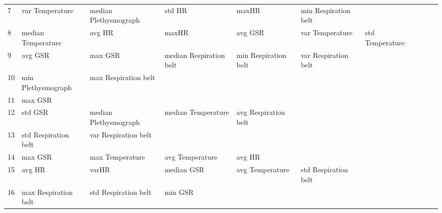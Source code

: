 \begin{landscape}
\begin{table}[]
\begin{tabular}{l|llllllll}
7        & var Temperature         & median Plethysmograph & std HR                  & maxHR                   & min Respiration belt    &                       &                      &          &                      &        \\
8        & median Temperature      & avg HR                & maxHR                   & avg GSR                 & var Temperature         & std Temperature       &                      &          &                      &        \\
9        & avg GSR                 & max GSR               & median Respiration belt & min Respiration belt    & var Respiration belt    &                       &                      &          &                      &        \\
10       & min Plethysmograph      & max Respiration belt  &                         &                         &                         &                       &                      &          &                      &        \\
11       & max GSR                 &                       &                         &                         &                         &                       &                      &          &                      &        \\
12       & std GSR                 & median Plethysmograph & median Temperature      & avg Respiration belt    &                         &                       &                      &          &                      &        \\
13       & std Respiration belt    & var Respiration belt  &                         &                         &                         &                       &                      &          &                      &        \\
14       & max GSR                 & max Temperature       & avg Temperature         & avg HR                  &                         &                       &                      &          &                      &        \\
15       & avg HR                  & varHR                 & median GSR              & avg Temperature         & std Respiration belt    &                       &                      &          &                      &        \\
16       & max Respiration belt    & std Respiration belt  & min GSR                 &                         &                         &                       &                      &          &                      &        \\

\end{tabular}
\end{table}
\end{landscape}
